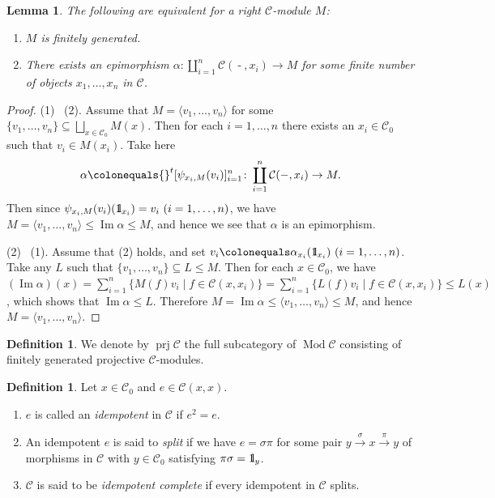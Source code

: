\documentclass{surv-l}
\numberwithin{equation}{chapter}
\numberwithin{figure}{chapter}
\theoremstyle{plain}
\newtheorem{lem}[thm]{Lemma}
\theoremstyle{definition}
\newtheorem{dfn}[thm]{Definition}
\theoremstyle{remark}
\newcommand{\id}{1\kern-.25em{\text{{\rm l}}}}
\DeclareMathOperator{\Mod}{Mod}
\DeclareMathOperator{\prj}{prj}
\DeclareMathOperator{\blank}{-}
\begin{document}
\begin{lem}\label{lem:fg}
The following are equivalent for a right ${\mathcal{C}}$-module $M$:
\begin{enumerate}
\item
$M$ is finitely generated.
\item
There exists an epimorphism
$\alpha \colon \coprod_{i=1}^n {\mathcal{C}}(\blank, x_i) \to M$
for some finite number of objects $x_1, \dots, x_n$ in ${\mathcal{C}}$.
\end{enumerate}
\end{lem}

\begin{proof}
(1) \text{$\Rightarrow$}\  (2).
Assume that $M = {\langle v_1, \dots, v_n \rangle}$ for some $\{v_1,\dots, v_n\} \subseteq \bigsqcup_{x\in {\mathcal{C}}_0} M(x)$.
Then for each $i = 1,\dots, n$ there exists an $x_i \in {\mathcal{C}}_0$ such that
$v_i \in M(x_i)$.
Take here
\[
\alpha\colonequals  {}^t[\psi_{x_i,M}(v_i)]_{i=1}^n \colon \coprod_{i=1}^n {\mathcal{C}}(\blank, x_i) \to M.
\]
Then since $\psi_{x_i,M}(v_i)(\id_{x_i}) = v_i \ (i=1,\dots, n)$, we have
$M = {\langle v_1, \dots, v_n \rangle} \le \operatorname{Im} \alpha \le M$,
and hence we see that $\alpha$ is an epimorphism.

(2) \text{$\Rightarrow$}\  (1).
Assume that (2) holds, and set $v_i\colonequals  \alpha_{x_i}(\id_{x_i}) \ (i = 1,\dots, n)$.
Take any $L$ such that $\{v_1, \dots, v_n\} \subseteq L \le M$.
Then for each $x \in {\mathcal{C}}_0$, we have
$(\operatorname{Im} \alpha)(x) = \sum_{i=1}^n\{M(f)v_i \mid f \in {\mathcal{C}}(x, x_i)\}
= \sum_{i=1}^n\{L(f)v_i \mid f \in {\mathcal{C}}(x, x_i)\} \le L(x)$, which shows that
$\operatorname{Im} \alpha \le L$.
Therefore
$M = \operatorname{Im} \alpha \le {\langle v_1, \dots, v_n \rangle}\le M$, and hence
$M = {\langle v_1, \dots, v_n \rangle}$.
\end{proof}

\begin{dfn}
We denote by $\prj {\mathcal{C}}$ the full subcategory of $\Mod{\mathcal{C}}$ consisting of
finitely generated projective ${\mathcal{C}}$-modules.
\end{dfn}

\begin{dfn}\label{def:2.5.17}
Let $x \in {\mathcal{C}}_0$ and $e \in {\mathcal{C}}(x,x)$.
\begin{enumerate}
\item
$e$ is called an \emph{idempotent} in ${\mathcal{C}}$ if $e^2 = e$.
\item
An idempotent $e$ is said to \emph{split} if we have $e = \sigma\pi$
for some pair $y \xrightarrow{\sigma} x \xrightarrow{\pi} y$ of morphisms in ${\mathcal{C}}$ with $y \in {\mathcal{C}}_0$
satisfying $\pi\sigma = \id_y$.
\item
${\mathcal{C}}$ is said to be \emph{idempotent complete} if
every idempotent in ${\mathcal{C}}$ splits.
\end{enumerate}
\end{dfn}
\end{document}
